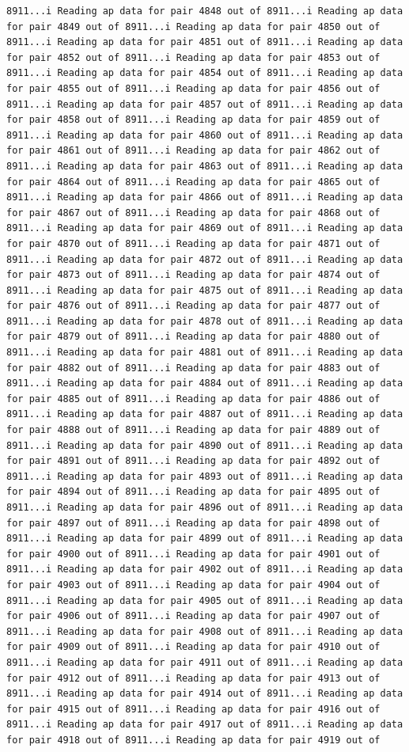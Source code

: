 \documentclass[
]{article}
\begin{document}
\begin{verbatim}
8911...i Reading ap data for pair 4848 out of 8911...i Reading ap data for pair 4849 out of 8911...i Reading ap data for pair 4850 out of 8911...i Reading ap data for pair 4851 out of 8911...i Reading ap data for pair 4852 out of 8911...i Reading ap data for pair 4853 out of 8911...i Reading ap data for pair 4854 out of 8911...i Reading ap data for pair 4855 out of 8911...i Reading ap data for pair 4856 out of 8911...i Reading ap data for pair 4857 out of 8911...i Reading ap data for pair 4858 out of 8911...i Reading ap data for pair 4859 out of 8911...i Reading ap data for pair 4860 out of 8911...i Reading ap data for pair 4861 out of 8911...i Reading ap data for pair 4862 out of 8911...i Reading ap data for pair 4863 out of 8911...i Reading ap data for pair 4864 out of 8911...i Reading ap data for pair 4865 out of 8911...i Reading ap data for pair 4866 out of 8911...i Reading ap data for pair 4867 out of 8911...i Reading ap data for pair 4868 out of 8911...i Reading ap data for pair 4869 out of 8911...i Reading ap data for pair 4870 out of 8911...i Reading ap data for pair 4871 out of 8911...i Reading ap data for pair 4872 out of 8911...i Reading ap data for pair 4873 out of 8911...i Reading ap data for pair 4874 out of 8911...i Reading ap data for pair 4875 out of 8911...i Reading ap data for pair 4876 out of 8911...i Reading ap data for pair 4877 out of 8911...i Reading ap data for pair 4878 out of 8911...i Reading ap data for pair 4879 out of 8911...i Reading ap data for pair 4880 out of 8911...i Reading ap data for pair 4881 out of 8911...i Reading ap data for pair 4882 out of 8911...i Reading ap data for pair 4883 out of 8911...i Reading ap data for pair 4884 out of 8911...i Reading ap data for pair 4885 out of 8911...i Reading ap data for pair 4886 out of 8911...i Reading ap data for pair 4887 out of 8911...i Reading ap data for pair 4888 out of 8911...i Reading ap data for pair 4889 out of 8911...i Reading ap data for pair 4890 out of 8911...i Reading ap data for pair 4891 out of 8911...i Reading ap data for pair 4892 out of 8911...i Reading ap data for pair 4893 out of 8911...i Reading ap data for pair 4894 out of 8911...i Reading ap data for pair 4895 out of 8911...i Reading ap data for pair 4896 out of 8911...i Reading ap data for pair 4897 out of 8911...i Reading ap data for pair 4898 out of 8911...i Reading ap data for pair 4899 out of 8911...i Reading ap data for pair 4900 out of 8911...i Reading ap data for pair 4901 out of 8911...i Reading ap data for pair 4902 out of 8911...i Reading ap data for pair 4903 out of 8911...i Reading ap data for pair 4904 out of 8911...i Reading ap data for pair 4905 out of 8911...i Reading ap data for pair 4906 out of 8911...i Reading ap data for pair 4907 out of 8911...i Reading ap data for pair 4908 out of 8911...i Reading ap data for pair 4909 out of 8911...i Reading ap data for pair 4910 out of 8911...i Reading ap data for pair 4911 out of 8911...i Reading ap data for pair 4912 out of 8911...i Reading ap data for pair 4913 out of 8911...i Reading ap data for pair 4914 out of 8911...i Reading ap data for pair 4915 out of 8911...i Reading ap data for pair 4916 out of 8911...i Reading ap data for pair 4917 out of 8911...i Reading ap data for pair 4918 out of 8911...i Reading ap data for pair 4919 out of 
\end{verbatim}
\end{document}
